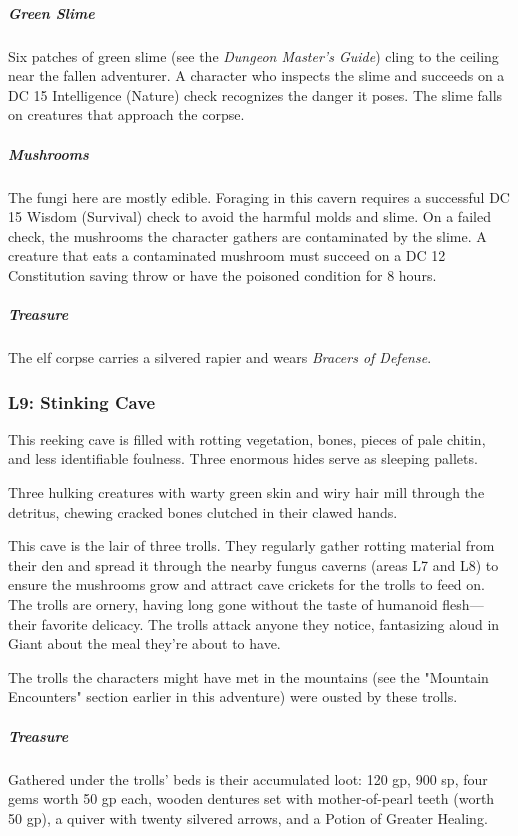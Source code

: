 \documentclass[10pt,a4paper,twoside,bg=print,twocolumn,openany,nodeprecatedcode]{dndbook}
\begin{document}
\subparagraph{Green Slime}
Six patches of green slime (see the \textit{Dungeon Master's Guide}) cling to the ceiling near the fallen adventurer. A character who inspects the slime and succeeds on a DC 15 Intelligence (Nature) check recognizes the danger it poses. The slime falls on creatures that approach the corpse.

\subparagraph{Mushrooms}
The fungi here are mostly edible. Foraging in this cavern requires a successful DC 15 Wisdom (Survival) check to avoid the harmful molds and slime. On a failed check, the mushrooms the character gathers are contaminated by the slime. A creature that eats a contaminated mushroom must succeed on a DC 12 Constitution saving throw or have the poisoned condition for 8 hours.

\subparagraph{Treasure}
The elf corpse carries a silvered rapier and wears \textit{Bracers of Defense}.

\subsubsection{L9: Stinking Cave}
\begin{DndReadAloud}{}
This reeking cave is filled with rotting vegetation, bones, pieces of pale chitin, and less identifiable foulness. Three enormous hides serve as sleeping pallets.

Three hulking creatures with warty green skin and wiry hair mill through the detritus, chewing cracked bones clutched in their clawed hands.

\end{DndReadAloud}

This cave is the lair of three trolls. They regularly gather rotting material from their den and spread it through the nearby fungus caverns (areas L7 and L8) to ensure the mushrooms grow and attract cave crickets for the trolls to feed on. The trolls are ornery, having long gone without the taste of humanoid flesh—their favorite delicacy. The trolls attack anyone they notice, fantasizing aloud in Giant about the meal they're about to have.

The trolls the characters might have met in the mountains (see the "Mountain Encounters" section earlier in this adventure) were ousted by these trolls.

\subparagraph{Treasure}
Gathered under the trolls' beds is their accumulated loot: 120 gp, 900 sp, four gems worth 50 gp each, wooden dentures set with mother-of-pearl teeth (worth 50 gp), a quiver with twenty silvered arrows, and a Potion of Greater Healing.
\end{document}
